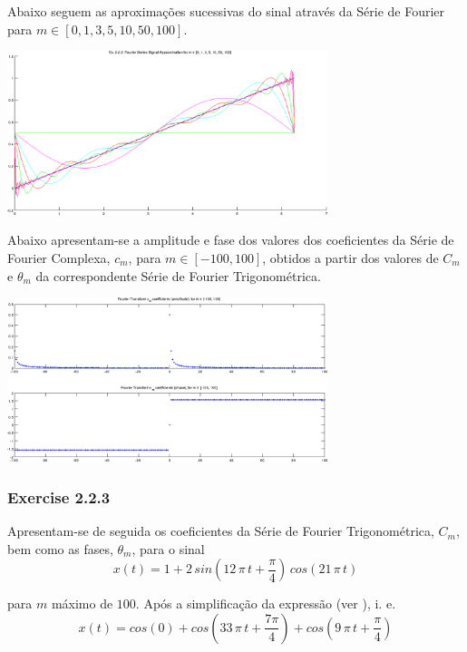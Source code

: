 \documentclass[a4paper]{article}
\begin{document}
\noindent Abaixo seguem as aproximações sucessivas do sinal através da Série de Fourier para $m \in [0, 1, 3, 5, 10, 50, 100]$.
\begin{center}
	\includegraphics[width=0.70\textwidth]{images/ex2_2_2_approx.png}
	\label{fig:ex2_2_2_approx}
\end{center}

\noindent Abaixo apresentam-se a amplitude e fase dos valores dos coeficientes da Série de Fourier Complexa, $c_m$, para $m \in [-100, 100]$, obtidos a partir dos valores de $C_m$ e $\theta_m$ da correspondente Série de Fourier Trigonométrica.
\begin{center}
	\includegraphics[width=0.70\textwidth]{images/ex2_2_2_complex_cm.png}
	\label{fig:ex2_2_2_complex_cm}
\end{center}

\subsubsection{Exercise 2.2.3}
\label{subsubsec:ex_2_2_3}
\noindent Apresentam-se de seguida os coeficientes da Série de Fourier Trigonométrica, $C_m$, bem como as fases, $\theta_m$, para o sinal
\[
	x(t) = 1 + 2 \, sin\left(12 \, \pi \, t + \frac{\pi}{4}\right) \, cos(21 \, \pi \, t)
\]

\noindent para $m$ máximo de $100$. Após a simplificação da expressão (ver \emph{}), i. e.
\[
	x(t) = cos(0) + cos\left(33 \, \pi \, t + \frac{7 \pi}{4}\right) + cos\left(9 \, \pi \, t + \frac{\pi}{4}\right)
\]
\end{document}
